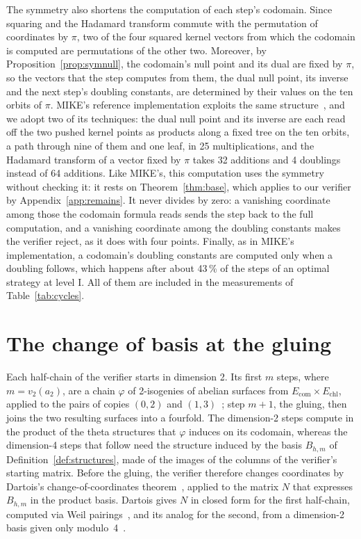 \documentclass[version=preprint]{iacrcc}
\newcommand{\Ecom}{E_{\mathrm{com}}}
\newcommand{\Echl}{E_{\mathrm{chl}}}
\begin{document}
    The symmetry also shortens the computation of each step's codomain. Since
    squaring and the Hadamard transform commute with the permutation of
    coordinates by $\pi$, two of the four squared kernel vectors from which the
    codomain is computed are permutations of the other two. Moreover, by
    Proposition~\ref{prop:symnull}, the codomain's null point and its dual are
    fixed by $\pi$, so the vectors that the step computes from them, the dual
    null point, its inverse and the next step's doubling constants, are
    determined by their values on the ten orbits of $\pi$. MIKE's reference
    implementation exploits the same structure~\cite{BDD+26}, and we adopt two
    of its techniques: the dual null point and its inverse are each read off the
    two pushed kernel points as products along a fixed tree on the ten orbits,
    a path through nine of them and one leaf, in 25 multiplications, and the
    Hadamard transform of a vector fixed by $\pi$ takes 32 additions and 4
    doublings instead of 64 additions. Like MIKE's, this computation uses
    the symmetry without checking it: it rests on Theorem~\ref{thm:base}, which
    applies to our verifier by Appendix~\ref{app:remains}. It never divides by zero: a vanishing
    coordinate among those the codomain formula reads sends the step back to
    the full computation, and a vanishing coordinate among the doubling
    constants makes the verifier reject, as it does with four points. Finally, as in
    MIKE's implementation, a codomain's doubling constants are computed only
    when a doubling follows, which happens after about 43\,\% of the steps of an
    optimal strategy at level I. All of them are included in the measurements of
    Table~\ref{tab:cycles}.

    \section{The change of basis at the gluing}
    \label{sec:gluing}

    Each half-chain of the verifier starts in dimension 2. Its first $m$
    steps, where $m = v_2(a_2)$, are a chain $\varphi$ of 2-isogenies of abelian
    surfaces from $\Ecom \times \Echl$, applied to the pairs of copies $(0, 2)$
    and $(1, 3)$~\cite[Lemmas 23 and 28]{Dar24}; step $m + 1$, the gluing, then
    joins the two resulting surfaces into a fourfold. The dimension-2 steps
    compute in the product of the theta structures that $\varphi$ induces on
    its codomain, whereas the dimension-4 steps that follow need the structure
    induced by the basis $B_{h,m}$ of Definition~\ref{def:structures}, made of
    the images of the columns of the verifier's starting matrix. Before the
    gluing, the verifier therefore changes coordinates by Dartois's
    change-of-coordinates theorem~\cite[Theorem 12]{Dar24}, applied to the matrix
    $N$ that expresses $B_{h,m}$ in the product basis. Dartois gives $N$ in
    closed form for the first half-chain, computed via Weil
    pairings~\cite[Lemma 30]{Dar24}, and its analog for the second, from a
    dimension-2 basis given only modulo~4~\cite[Lemma 31 and Appendix
    C.1]{Dar24}.
\end{document}

